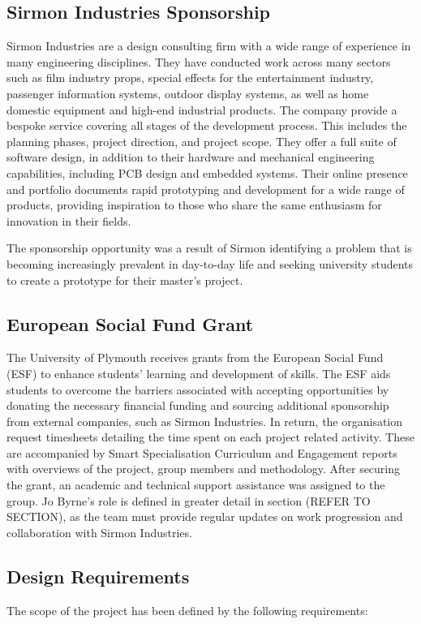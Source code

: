 \documentclass [12pt]{article}
\begin{document}
\subsection{Sirmon Industries Sponsorship}\label{sec:sponsorship}
Sirmon Industries are a design consulting firm with a wide range of experience in many engineering disciplines. They have conducted work across many sectors such as film industry props, special effects for the entertainment industry, passenger information systems, outdoor display systems, as well as home domestic equipment and high-end industrial products. The company provide a bespoke service covering all stages of the development process. This includes the planning phases, project direction, and project scope. They offer a full suite of software design, in addition to their hardware and mechanical engineering capabilities, including PCB design and embedded systems. Their online presence and portfolio documents rapid prototyping and development for a wide range of products, providing inspiration to those who share the same enthusiasm for innovation in their fields.

The sponsorship opportunity was a result of Sirmon identifying a problem that is becoming increasingly prevalent in day-to-day life and seeking university students to create a prototype for their master’s project.

\subsection{European Social Fund Grant}\label{sec:esf_grant}
The University of Plymouth receives grants from the European Social Fund (ESF) to enhance students’ learning and development of skills. The ESF aids students to overcome the barriers associated with accepting opportunities by donating the necessary financial funding and sourcing additional sponsorship from external companies, such as Sirmon Industries. In return, the organisation request timesheets detailing the time spent on each project related activity. These are accompanied by Smart Specialisation Curriculum and Engagement reports with overviews of the project, group members and methodology.
After securing the grant, an academic and technical support assistance was assigned to the group. Jo Byrne’s role is defined in greater detail in section (REFER TO SECTION), as the team must provide regular updates on work progression and collaboration with Sirmon Industries.


\subsection{Design Requirements}\label{sec:design_requirements}
The scope of the project has been defined by the following requirements: \\
\end{document}
